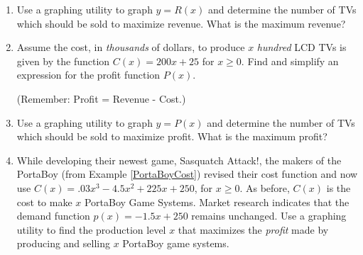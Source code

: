\begin{enumerate}
\setcounter{enumi}{\value{HW}}

\item  Use a graphing utility to graph $y = R(x)$ and determine the number of TVs which should be sold to maximize revenue.  What is the maximum revenue? \label{lcdmaxprofitexerfirst}

\item Assume the cost, in \textit{thousands} of dollars, to produce $x$ \textit{hundred} LCD TVs is given by the function $C(x) = 200x + 25$ for $x \geq 0$. Find and simplify an expression for the profit function $P(x)$.  

(Remember: Profit = Revenue - Cost.)

\item  Use a graphing utility to graph $y = P(x)$ and determine the number of TVs which should be sold to maximize profit.  What is the maximum  profit? \label{lcdmaxprofitexerlast}

\item \label{newportaboycost} While developing their newest game, Sasquatch Attack!, the makers of the PortaBoy (from Example \ref{PortaBoyCost}) revised their cost function and now use $C(x) = .03x^{3} - 4.5x^{2} + 225x + 250$, for $x \geq 0$. As before, $C(x)$ is the cost to make $x$ PortaBoy Game Systems.  Market research indicates that the demand function $p(x) = -1.5x + 250$ remains unchanged.  Use a graphing utility to find the production level $x$ that maximizes the \textit{profit} made by producing and selling $x$ PortaBoy game systems.

\setcounter{HW}{\value{enumi}}
\end{enumerate}

